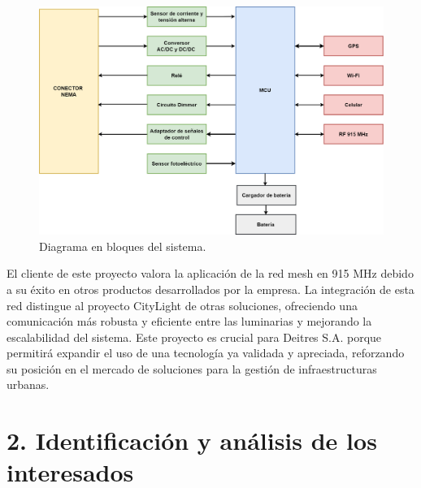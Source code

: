 \documentclass[
11pt, %
]{charter}
\begin{document}
\begin{figure}[htpb]
\centering 
\includegraphics[width=.9\textwidth]{./Figuras/diagBloquesGeneral.png}
\caption{Diagrama en bloques del sistema.}
\label{fig:diagBloquesGeneral}
\end{figure}

El cliente de este proyecto valora la aplicación de la red mesh en 915 MHz debido a su éxito en otros productos desarrollados por la empresa. La integración de esta red distingue al proyecto CityLight de otras soluciones, ofreciendo una comunicación más robusta y eficiente entre las luminarias y mejorando la escalabilidad del sistema. Este proyecto es crucial para Deitres S.A. porque permitirá expandir el uso de una tecnología ya validada y apreciada, reforzando su posición en el mercado de soluciones para la gestión de infraestructuras urbanas.

 \pagebreak

\section{2. Identificación y análisis de los interesados}
\label{sec:interesados}
\end{document}
